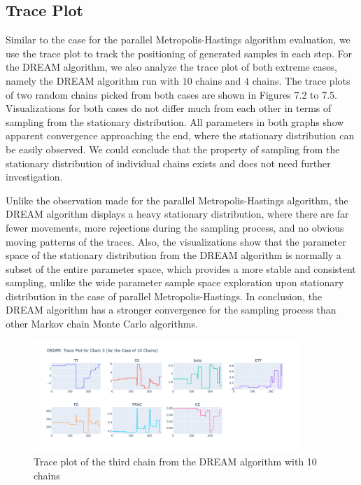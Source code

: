 \subsection{Trace Plot}
Similar to the case for the parallel Metropolis-Hastings algorithm evaluation, we use the trace plot to track the positioning of generated samples in each step. For the DREAM algorithm, we also analyze the trace plot of both extreme cases, namely the DREAM algorithm run with $10$ chains and $4$ chains. The trace plots of two random chains picked from both cases are shown in Figures 7.2 to 7.5. Visualizations for both cases do not differ much from each other in terms of sampling from the stationary distribution. All parameters in both graphs show apparent convergence approaching the end, where the stationary distribution can be easily observed. We could conclude that the property of sampling from the stationary distribution of individual chains exists and does not need further investigation.

Unlike the observation made for the parallel Metropolis-Hastings algorithm, the DREAM algorithm displays a heavy stationary distribution, where there are far fewer movements, more rejections during the sampling process, and no obvious moving patterns of the traces. Also, the visualizations show that the parameter space of the stationary distribution from the DREAM algorithm is normally a subset of the entire parameter space, which provides a more stable and consistent sampling, unlike the wide parameter sample space exploration upon stationary distribution in the case of parallel Metropolis-Hastings. In conclusion, the DREAM algorithm has a stronger convergence for the sampling process than other Markov chain Monte Carlo algorithms.

\begin{figure}[H]
    \centering
    \includegraphics[width=0.9\textwidth]{figures/dream/tp_rand_10_3.png}
    \captionsetup{width=.8\textwidth}
    \caption{Trace plot of the third chain from the DREAM algorithm with 10 chains}
    \label{fig:enter-label}
\end{figure}

